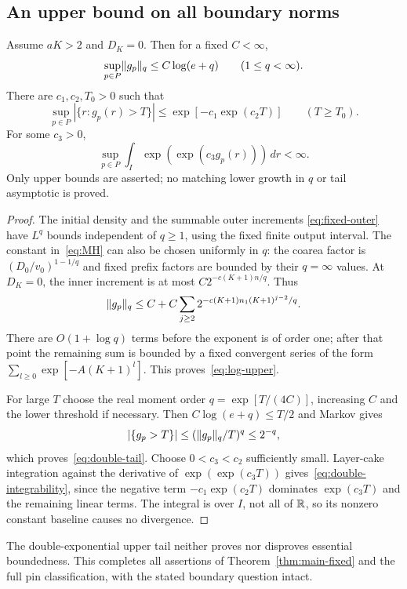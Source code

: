 \subsection{An upper bound on all boundary norms}
\begin{theorem}\label{thm:log-upper}
Assume $aK>2$ and $D_K=0$. Then for a fixed $C<\infty$,
\begin{equation}\label{eq:log-upper}
 \sup_{p\in P}\lVert g_p\rVert_q\leq C\log(e+q)
 \qquad(1\leq q<\infty).
\end{equation}
There are $c_1,c_2,T_0>0$ such that
\begin{equation}\label{eq:double-tail}
 \sup_{p\in P}|\{r:g_p(r)>T\}|
 \leq \exp[-c_1\exp(c_2T)]\qquad(T\geq T_0).
\end{equation}
For some $c_3>0$,
\begin{equation}\label{eq:double-integrability}
 \sup_{p\in P}\int_I\exp(\exp(c_3g_p(r)))\,dr<\infty.
\end{equation}
Only upper bounds are asserted; no matching lower growth in $q$ or tail
asymptotic is proved.
\end{theorem}
\begin{proof}
The initial density and the summable outer increments
\eqref{eq:fixed-outer} have $L^q$ bounds independent of $q\geq1$, using
the fixed finite output interval. The constant in~\eqref{eq:MH} can also
be chosen uniformly in $q$: the coarea factor is
$(D_0/v_0)^{1-1/q}$ and fixed prefix factors are bounded by their
$q=\infty$ values. At $D_K=0$, the inner increment is at most
$C2^{-c(K+1)n/q}$. Thus
\begin{equation}\label{eq:lacunary-moment-series}
 \lVert g_p\rVert_q\leq C+C\sum_{j\geq2}
 2^{-c(K+1)n_1(K+1)^{j-2}/q}.
\end{equation}
There are $O(1+\log q)$ terms before the exponent is of order one;
after that point the remaining sum is bounded by a fixed convergent
series of the form $\sum_{l\geq0}\exp[-A(K+1)^l]$.
This proves~\eqref{eq:log-upper}.

For large $T$ choose the real moment order $q=\exp[T/(4C)]$,
increasing $C$ and the lower threshold if necessary. Then
$C\log(e+q)\leq T/2$ and Markov gives
\[
 |\{g_p>T\}|\leq(\lVert g_p\rVert_q/T)^q\leq2^{-q},
\]
which proves~\eqref{eq:double-tail}. Choose $0<c_3<c_2$ sufficiently
small. Layer-cake integration against the derivative of
$\exp(\exp(c_3T))$ gives~\eqref{eq:double-integrability}, since the
negative term $-c_1\exp(c_2T)$ dominates $\exp(c_3T)$ and the remaining
linear terms. The integral is over $I$, not all of $\mathbb R$, so its nonzero
constant baseline causes no divergence.
\end{proof}
The double-exponential upper tail neither proves nor disproves essential
boundedness. This completes all assertions of Theorem~\ref{thm:main-fixed}
and the full pin classification, with the stated boundary question intact.
